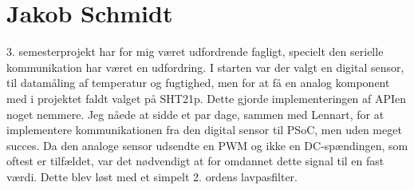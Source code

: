 \section{Jakob Schmidt}

3. semesterprojekt har for mig været udfordrende fagligt, specielt den serielle kommunikation har været en udfordring. I starten var der valgt en digital sensor, til datamåling af temperatur og fugtighed, men for at få en analog komponent med i projektet faldt valget på SHT21p. Dette gjorde implementeringen af APIen noget nemmere. Jeg nåede at sidde et par dage, sammen med Lennart, for at implementere kommunikationen fra den digital sensor til PSoC, men uden meget succes. 
Da den analoge sensor udsendte en PWM og ikke en DC-spændingen, som oftest er tilfældet, var det nødvendigt at for omdannet dette signal til en fast værdi. Dette blev løst med et simpelt 2. ordens lavpasfilter. 

